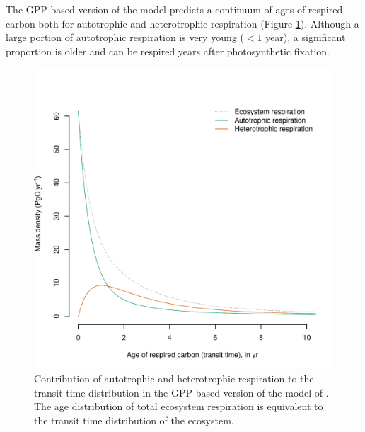 \documentclass[12pt, a4paper]{article}
\begin{document}
The GPP-based version of the model predicts a continuum of ages of respired carbon both for autotrophic and heterotrophic respiration (Figure \ref{fig:TTcontributions}). Although a large portion of autotrophic respiration is very young ($< 1$ year), a significant proportion is older and can be respired years after photosynthetic fixation. 


\begin{figure}[htbp]
   \centering
   \includegraphics[scale=0.9]{TT_contributions.pdf} %
   \caption{Contribution of autotrophic and heterotrophic respiration to the transit time distribution in the GPP-based version of the model of \citet{Emanuel1981}. The age distribution of total ecosystem respiration is equivalent to the transit time distribution of the ecosystem. }
   \label{fig:TTcontributions}
\end{figure}

\end{document}

